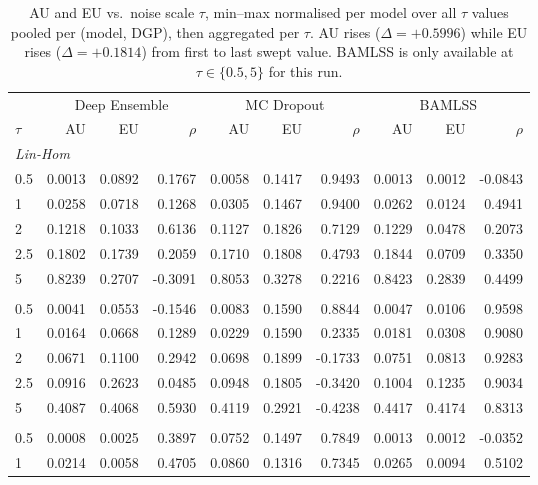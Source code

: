 \begin{table}
\centering
\small
\setlength{\tabcolsep}{4pt}
\caption{AU and EU vs.\ noise scale $\tau$, min--max normalised per model over all $\tau$ values pooled per (model, DGP), then aggregated per $\tau$. AU rises (\ensuremath{\Delta=+0.5996}) while EU rises (\ensuremath{\Delta=+0.1814}) from first to last swept value. BAMLSS is only available at $\tau\in\{0.5,5\}$ for this run.}
\label{tab:noise}
\begin{tabular}{lrrrrrrrrr}
\toprule
 & \multicolumn{3}{c}{Deep Ensemble} & \multicolumn{3}{c}{MC Dropout} & \multicolumn{3}{c}{BAMLSS} \\
\cmidrule(lr){2-4} \cmidrule(lr){5-7} \cmidrule(lr){8-10}
$\tau$ & AU & EU & $\rho$ & AU & EU & $\rho$ & AU & EU & $\rho$ \\
\midrule
\multicolumn{10}{l}{\textit{Lin-Hom}} \\
0.5 & 0.0013 & 0.0892 & 0.1767 & 0.0058 & 0.1417 & 0.9493 & 0.0013 & 0.0012 & -0.0843 \\
1 & 0.0258 & 0.0718 & 0.1268 & 0.0305 & 0.1467 & 0.9400 & 0.0262 & 0.0124 & 0.4941 \\
2 & 0.1218 & 0.1033 & 0.6136 & 0.1127 & 0.1826 & 0.7129 & 0.1229 & 0.0478 & 0.2073 \\
2.5 & 0.1802 & 0.1739 & 0.2059 & 0.1710 & 0.1808 & 0.4793 & 0.1844 & 0.0709 & 0.3350 \\
5 & 0.8239 & 0.2707 & -0.3091 & 0.8053 & 0.3278 & 0.2216 & 0.8423 & 0.2839 & 0.4499 \\
\addlinespace
\multicolumn{10}{l}{\textit{Lin-Het}} \\
0.5 & 0.0041 & 0.0553 & -0.1546 & 0.0083 & 0.1590 & 0.8844 & 0.0047 & 0.0106 & 0.9598 \\
1 & 0.0164 & 0.0668 & 0.1289 & 0.0229 & 0.1590 & 0.2335 & 0.0181 & 0.0308 & 0.9080 \\
2 & 0.0671 & 0.1100 & 0.2942 & 0.0698 & 0.1899 & -0.1733 & 0.0751 & 0.0813 & 0.9283 \\
2.5 & 0.0916 & 0.2623 & 0.0485 & 0.0948 & 0.1805 & -0.3420 & 0.1004 & 0.1235 & 0.9034 \\
5 & 0.4087 & 0.4068 & 0.5930 & 0.4119 & 0.2921 & -0.4238 & 0.4417 & 0.4174 & 0.8313 \\
\addlinespace
\multicolumn{10}{l}{\textit{Sin-Hom}} \\
0.5 & 0.0008 & 0.0025 & 0.3897 & 0.0752 & 0.1497 & 0.7849 & 0.0013 & 0.0012 & -0.0352 \\
1 & 0.0214 & 0.0058 & 0.4705 & 0.0860 & 0.1316 & 0.7345 & 0.0265 & 0.0094 & 0.5102 \\

\end{tabular}
\end{table}
